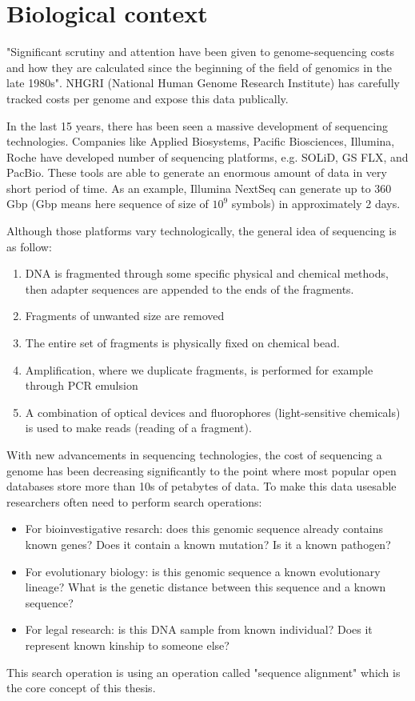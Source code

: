 \section{Biological context}
\label{sec:biology-sequences}

"Significant scrutiny and attention have been given to genome-sequencing costs and how they are calculated since the beginning of the field of genomics in the late 1980s". \cite{nhgri_sequencing_cost_2026}
NHGRI (National Human Genome Research Institute) has carefully tracked costs per genome and expose this data publically.


In the last 15 years, there has been seen a massive development of sequencing technologies. Companies like Applied Biosystems, Pacific Biosciences, Illumina, Roche have developed number of sequencing platforms, 
e.g. SOLiD, GS FLX, and PacBio. These tools are able to generate an enormous amount of data in very short period of time.
As an example, Illumina NextSeq can generate up to 360 Gbp (Gbp means here sequence of size of $10^9$ symbols) in approximately 2 days.~\autocite{illumina_website}
 
\noindent Although those platforms vary technologically, the general idea of sequencing is as follow:
\begin{enumerate}
\item DNA is fragmented through some specific physical and chemical methods, then adapter sequences are appended to the ends of the fragments.
\item Fragments of unwanted size are removed
\item The entire set of fragments is physically fixed on chemical bead.
\item Amplification, where we duplicate fragments, is performed for example through PCR emulsion
\item A combination of optical devices and fluorophores (light-sensitive chemicals) is used to make reads (reading of a fragment).
\end{enumerate}

With new advancements in sequencing technologies, the cost of sequencing a genome has been decreasing significantly to the point where most popular open databases store more than 10s of petabytes of data.
To make this data usesable researchers often need to perform search operations:
\begin{itemize}
\item For bioinvestigative resarch: does this genomic sequence already contains known genes? Does it contain a known mutation? Is it a known pathogen?
\item For evolutionary biology: is this genomic sequence a known evolutionary lineage? What is the genetic distance between this sequence and a known sequence?
\item For legal research: is this DNA sample from known individual? Does it represent known kinship to someone else?
\end{itemize}
This search operation is using an operation called "sequence alignment" which is the core concept of this thesis.

